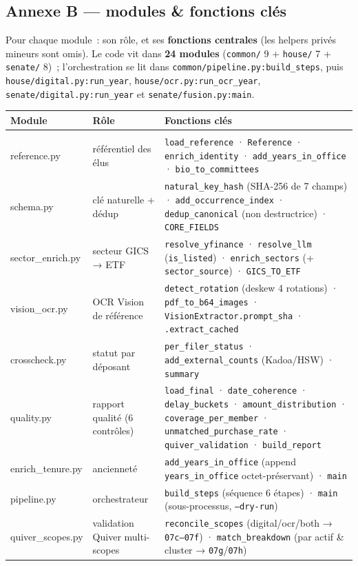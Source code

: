 \documentclass[11pt,a4paper]{article}
\newcommand{\co}[1]{\texttt{\small #1}}
\begin{document}
\subsection{Annexe B — modules \& fonctions clés}
\label{anx:modules}
Pour chaque module~: son rôle, et ses \textbf{fonctions centrales} (les helpers privés mineurs sont
omis). Le code vit dans \textbf{24 modules} (\co{common/} 9 + \co{house/} 7 + \co{senate/} 8)~;
l'orchestration se lit dans \co{common/pipeline.py:build_steps}, puis \co{house/digital.py:run_year},
\co{house/ocr.py:run_ocr_year}, \co{senate/digital.py:run_year} et \co{senate/fusion.py:main}.
{\footnotesize
\begin{longtable}{>{\ttfamily\footnotesize}p{2.4cm} p{4.0cm} p{8.8cm}}
\toprule
\normalfont\bfseries Module & \bfseries Rôle & \normalfont\bfseries Fonctions clés \\
\midrule\endhead
\multicolumn{3}{l}{\bfseries\color{coreC} common/ — le contrat universel partagé (9)}\\
reference.py & référentiel des élus & \co{load_reference} · \co{Reference} · \co{enrich_identity} · \co{add_years_in_office} · \co{bio_to_committees} \\
schema.py & clé naturelle + dédup & \co{natural_key_hash} (SHA-256 de 7 champs) · \co{add_occurrence_index} · \co{dedup_canonical} (non destructrice) · \co{CORE_FIELDS} \\
sector_enrich.py & secteur GICS → ETF & \co{resolve_yfinance} · \co{resolve_llm} (\co{is_listed}) · \co{enrich_sectors} (+ \co{sector_source}) · \co{GICS_TO_ETF} \\
vision_ocr.py & OCR Vision de référence & \co{detect_rotation} (deskew 4 rotations) · \co{pdf_to_b64_images} · \co{VisionExtractor.prompt_sha} · \co{.extract_cached} \\
crosscheck.py & statut par déposant & \co{per_filer_status} · \co{add_external_counts} (Kadoa/HSW) · \co{summary} \\
quality.py & rapport qualité (6 contrôles) & \co{load_final} · \co{date_coherence} · \co{delay_buckets} · \co{amount_distribution} · \co{coverage_per_member} · \co{unmatched_purchase_rate} · \co{quiver_validation} · \co{build_report} \\
enrich_tenure.py & ancienneté & \co{add_years_in_office} (append \co{years_in_office} octet-préservant) · \co{main} \\
pipeline.py & orchestrateur & \co{build_steps} (séquence 6 étapes) · \co{main} (sous-processus, \co{--dry-run}) \\
quiver_scopes.py & validation Quiver multi-scopes & \co{reconcile_scopes} (digital/ocr/both → \co{07c--07f}) · \co{match_breakdown} (par actif \& cluster → \co{07g}/\co{07h}) \\

\end{longtable}}
\end{document}

